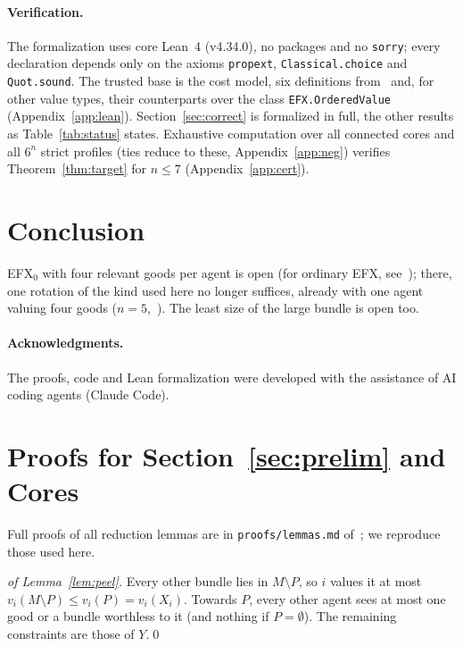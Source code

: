 \documentclass[runningheads,11pt]{llncs}
\newcommand{\efxz}{\texorpdfstring{\mbox{EFX$_0$}}{EFX0}}
\begin{document}
\paragraph{Verification.}\label{sec:lean} The formalization uses core Lean~4 (v4.34.0), no packages and no \texttt{sorry}; every declaration depends only on the axioms \texttt{propext}, \texttt{Classical.choice} and \texttt{Quot.sound}. The trusted base is the cost model, six definitions from~\cite{MrdEfx} and, for other value types, their counterparts over the class \texttt{EFX.OrderedValue} (Appendix~\ref{app:lean}). Section~\ref{sec:correct} is formalized in full, the other results as Table~\ref{tab:status} states. Exhaustive computation over all connected cores and all $6^n$ strict profiles (ties reduce to these, Appendix~\ref{app:neg}) verifies Theorem~\ref{thm:target} for $n\le7$ (Appendix~\ref{app:cert}).

\section{Conclusion}\label{sec:concl}

\efxz{} with four relevant goods per agent is open (for ordinary EFX, see~\cite{ViswanathanM24}); there, one rotation of the kind used here no longer suffices, already with one agent valuing four goods ($n=5$,~\cite{Repo}). The least size of the large bundle is open too.

\paragraph{Acknowledgments.} The proofs, code and Lean formalization were developed with the assistance of AI coding agents (Claude Code).




\clearpage
\appendix

\section{Proofs for Section~\ref{sec:prelim} and Cores}\label{app:prelim}

Full proofs of all reduction lemmas are in \texttt{proofs/lemmas.md} of~\cite{Repo}; we reproduce those used here.

\begin{proof}[of Lemma~\ref{lem:peel}]
Every other bundle lies in $M\setminus P$, so $i$ values it at most $v_i(M\setminus P)\le v_i(P)=v_i(X_i)$. Towards $P$, every other agent sees at most one good or a bundle worthless to it (and nothing if $P=\emptyset$). The remaining constraints are those of $Y$.\qed
\end{proof}
\end{document}
